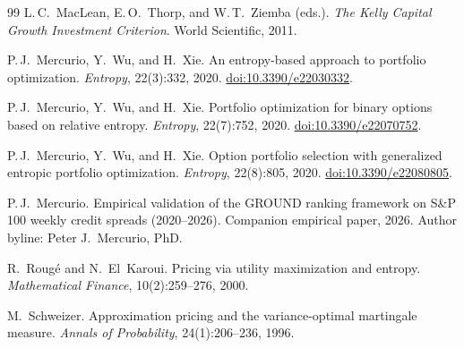 \documentclass[11pt]{article}
\providecommand{\doi}[1]{\href{https://doi.org/#1}{doi:#1}}
\theoremstyle{definition}
\theoremstyle{remark}
\begin{document}
\begin{thebibliography}{99}
L.\,C.~MacLean, E.\,O.~Thorp, and W.\,T.~Ziemba (eds.).
\newblock \emph{The Kelly Capital Growth Investment Criterion}.
\newblock World Scientific, 2011.

P.\,J.~Mercurio, Y.~Wu, and H.~Xie.
\newblock An entropy-based approach to portfolio optimization.
\newblock \emph{Entropy}, 22(3):332, 2020.
\newblock \doi{10.3390/e22030332}.

P.\,J.~Mercurio, Y.~Wu, and H.~Xie.
\newblock Portfolio optimization for binary options based on relative entropy.
\newblock \emph{Entropy}, 22(7):752, 2020.
\newblock \doi{10.3390/e22070752}.

P.\,J.~Mercurio, Y.~Wu, and H.~Xie.
\newblock Option portfolio selection with generalized entropic portfolio optimization.
\newblock \emph{Entropy}, 22(8):805, 2020.
\newblock \doi{10.3390/e22080805}.

P.\,J.~Mercurio.
\newblock Empirical validation of the GROUND ranking framework on
S\&P 100 weekly credit spreads (2020--2026).
\newblock Companion empirical paper, 2026.
\newblock Author byline: Peter J.\ Mercurio, PhD.

R.~Roug\'e and N.~El~Karoui.
\newblock Pricing via utility maximization and entropy.
\newblock \emph{Mathematical Finance}, 10(2):259--276, 2000.

M.~Schweizer.
\newblock Approximation pricing and the variance-optimal martingale
measure.
\newblock \emph{Annals of Probability}, 24(1):206--236, 1996.

\end{thebibliography}
\end{document}
